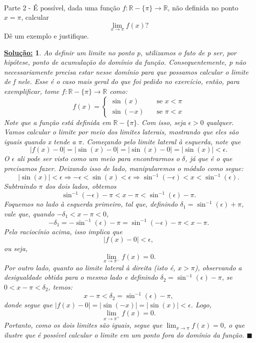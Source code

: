 \documentclass{article}
\newtheorem*{sol*}{\underline{Solu\c c\~ao:}}
\renewcommand\qedsymbol{$\blacksquare$}
\begin{document}
\paragraph{} Parte 2 - \'E poss\'ivel, dada uma fun\c c\~ao $f:\mathbb{R}-\{\pi\}\rightarrow \mathbb{R}$, n\~ao definida no ponto $x=\pi$, calcular
$$
	\lim_{x\to\pi}f(x)?
$$
D\^e um exemplo e justifique.
\begin{sol*}
	Ao definir um limite no ponto p, utilizamos o fato de p ser, por hip\'otese, ponto de acumula\c c\~ao do dom\'inio da fun\c c\~ao. Consequentemente, p n\~ao necessariamente precisa estar nesse dom\'inio para que possamos calcular o limite de f nele. Esse \'e o caso mais geral do que foi pedido no exerc\'icio, ent\~ao, para exemplificar, tome $f:\mathbb{R}-\{\pi\}\rightarrow\mathbb{R}$ como:
	$$
		f(x) = \left\{\begin{array}{ll}
			\sin(x)  & \quad \text{se } x < \pi \\
			\sin(-x) & \quad \text{se } \pi < x
		\end{array}\right.
	$$
	Note que a fun\c c\~ao est\'a definida em $\mathbb{R}-\{\pi\}.$ Com isso, seja $\epsilon > 0$ qualquer. Vamos calcular o limite por meio dos limites laterais, mostrando que eles s\~ao iguais quando x tende a $\pi$. Come\c cando pelo limite lateral \`a esquerda, note que
	$$
		|f(x) - 0| = |\sin(x) - 0| = |\sin(x) - 0| = |\sin(x)|< \epsilon.
	$$
	O $\epsilon$ ali pode ser visto como um meio para encontrarmos o $\delta$, j\'a que \'e o que precisamos fazer. Deixando isso de lado, manipularemos o m\'odulo como segue:
	$$
		|\sin(x)| < \epsilon \Rightarrow -\epsilon < \sin(x) < \epsilon \Rightarrow \sin^{-1}(-\epsilon) < x < \sin^{-1}(\epsilon).
	$$
	Subtraindo $\pi$ dos dois lados, obtemos
	$$
		\sin^{-1}(-\epsilon) - \pi < x - \pi < \sin^{-1}(\epsilon) - \pi.
	$$
	Foquemos no lado \`a esquerda primeiro, tal que, definindo $\delta_1 = \sin^{-1}(\epsilon) + \pi$, vale que, quando $-\delta_1 < x - \pi < 0$,
	$$
		-\delta_1 = -\sin^{-1}(\epsilon) - \pi = \sin^{-1}(-\epsilon) - \pi < x - \pi.
	$$
	Pelo racioc\'inio acima, isso implica que
	$$
		|f(x) - 0| < \epsilon,
	$$
	ou seja,
	$$
		\lim_{x\to\pi^{-}}f(x) = 0.
	$$
	Por outro lado, quanto ao limite lateral \`a direita (isto \'e, $x > \pi$), observando a desigualdade obtida para o mesmo lado e definindo $\delta_2 = \sin^{-1}(\epsilon) - \pi $, se $0 < x - \pi < \delta_2$, temos:
	$$
		x - \pi < \delta_2 = \sin^{-1}(\epsilon) - \pi,
	$$
	donde segue que $|f(x) - 0| = |\sin(-x)| = |\sin(x)| < \epsilon$. Logo,
	$$
		\lim_{x\to\pi^{+}}f(x) = 0.
	$$
	Portanto, como os dois limites s\~ao iguais, segue que $\lim_{x\to\pi} f(x) = 0$, o que ilustre que \'e poss\'ivel calcular o limite em um ponto fora do dom\'inio da fun\c c\~ao.
	\qedsymbol
\end{sol*}
\end{document}
